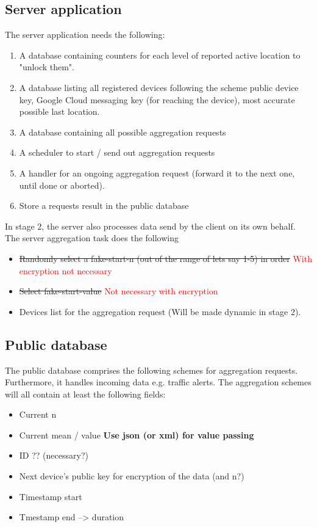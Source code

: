 \subsection{Server application}
The server application needs the following:
\begin{enumerate}
	\item A database containing counters for each level of reported active location to "unlock them".
	\item A database listing all registered devices following the scheme {public device key, Google Cloud messaging key (for reaching the device), most accurate possible last location}.
	\item A database containing all possible aggregation requests
	\item A scheduler to start / send out aggregation requests
	\item A handler for an ongoing aggregation request (forward it to the next one, until done or aborted).
	\item Store a requests result in the public database
\end{enumerate}
In stage 2, the server also processes data send by the client on its own behalf.
The server aggregation task does the following
\begin{itemize}
	\item \sout{Randomly select a fake-start-n (out of the range of lets say 1-5) in order } \textcolor{red}{With encryption not necessary}
	\item \sout{Select fake-start-value} \textcolor{red}{Not necessary with encryption}
	\item Devices list for the aggregation request (Will be made dynamic in stage 2).
\end{itemize}

\subsection{Public database}
The public database comprises the following schemes for aggregation requests.
Furthermore, it handles incoming data e.g. traffic alerts.
The aggregation schemes will all contain at least the following fields:
\begin{itemize}
	\item Current n
	\item Current mean / value \textbf{Use json (or xml) for value passing}
	\item ID ?? (necessary?)
	\item Next device's public key for encryption of the data (and n?)
	\item Timestamp start
	\item Tmestamp end --> duration
\end{itemize}

